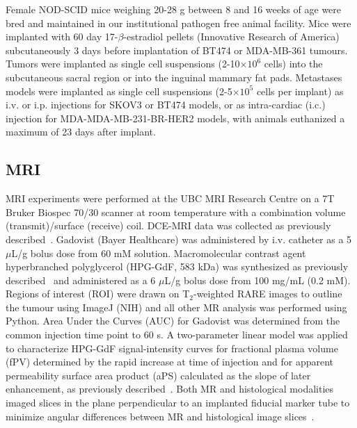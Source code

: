 Female NOD-SCID mice weighing 20-28 g between 8 and 16 weeks of age were bred and maintained in our institutional pathogen free animal facility.
Mice were implanted with 60 day 17-$\beta$-estradiol pellets (Innovative Research of America) subcutaneously 3 days before implantation of \acs{BT474} or \acs{MDA-MB-361} tumours.
Tumors were implanted as single cell suspensions (2-10$\times 10^6$ cells) into the subcutaneous sacral region or into the inguinal mammary fat pads.
Metastases models were implanted as single cell suspensions (2-5$\times 10^5$ cells per implant) as \acs{i.v.} or \acs{i.p.} injections for SKOV3 or \acs{BT474} models, or as intra-cardiac (\acs{i.c.}) injection for MDA-MDA-MB-231-BR-\acs{HER2} models, with animals euthanized a maximum of 23 days after implant.

\subsection{MRI}
MRI experiments were performed at the UBC MRI Research Centre on a 7T Bruker Biospec 70/30 scanner at room temperature with a combination volume (transmit)/surface (receive) coil.
\acs{DCE-MRI} data was collected as previously described~\cite{Baker:2015cob}.
Gadovist (Bayer Healthcare) was administered by \acs{i.v.} catheter as a 5 $\mu$L/g bolus dose from 60 mM solution.
Macromolecular contrast agent hyperbranched polyglycerol (\acs{HPG-GdF}, 583 kDa) was synthesized as previously described~\cite{Kainthan:2006ce,Saatchi:2012hc} and administered as a 6 $\mu$L/g bolus dose from 100 mg/mL (0.2 mM).
Regions of interest (ROI) were drawn on T$_2$-weighted \acs{RARE} images to outline the tumour using ImageJ (NIH) and all other MR analysis was performed using Python.
Area Under the Curves (AUC) for Gadovist was determined from the common injection time point to 60 s.
A two-parameter linear model was applied to characterize \acs{HPG-GdF} signal-intensity curves for fractional plasma volume (fPV) determined by the rapid increase at time of injection and for apparent permeability surface area product (aPS) calculated as the slope of later enhancement, as previously described~\cite{Baker:2015cob}.
Both MR and histological modalities imaged slices in the plane perpendicular to an implanted fiducial marker tube to minimize angular differences between MR and histological image slices~\cite{Bains:2009hh}.

